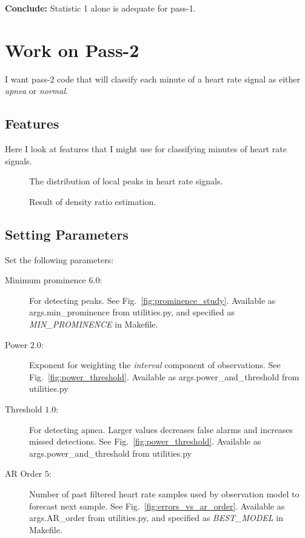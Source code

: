 \documentclass[12pt]{article}
\begin{document}
\textbf{Conclude:} Statistic 1 alone is adequate for pass-1.

\section{Work on Pass-2}
\label{sec:pass-2}

I want pass-2 code that will classify each minute of a heart rate
signal as either \emph{apnea} or \emph{normal}.

\subsection{Features}
\label{sec:reatures}

Here I look at features that I might use for classifying minutes of
heart rate signals.

\begin{figure}
  \centering
    \caption{The distribution of local peaks in heart rate signals.}
  \label{fig:analyze_peaks}
\end{figure}

\begin{figure}
  \centering
    \caption{Result of density ratio estimation.}
  \label{fig:interval_pdfs}
\end{figure}

\subsection{Setting Parameters}
\label{sec:setting_parameters}

Set the following parameters:
\begin{description}
\item[Minimum prominence $6.0$:] For detecting peaks.  See
  Fig.~\ref{fig:prominence_study}.  Available as args.min\_prominence
  from utilities.py, and specified as \emph{MIN\_PROMINENCE} in Makefile.
\item[Power $2.0$:] Exponent for weighting the \emph{interval}
  component of observations.  See Fig.~\ref{fig:power_threshold}.
  Available as args.power\_and\_threshold from utilities.py
\item[Threshold $1.0$:] For detecting apnea.  Larger values decreases
  false alarms and increases missed detections.  See
  Fig.~\ref{fig:power_threshold}.  Available as
  args.power\_and\_threshold from utilities.py
\item[AR Order $5$:] Number of past filtered heart rate samples used
  by observation model to forecast next sample.  See
  Fig.~\ref{fig:errors_vs_ar_order}.  Available as args.AR\_order from
  utilities.py, and specified as \emph{BEST\_MODEL} in Makefile.
\end{description}
\end{document}
